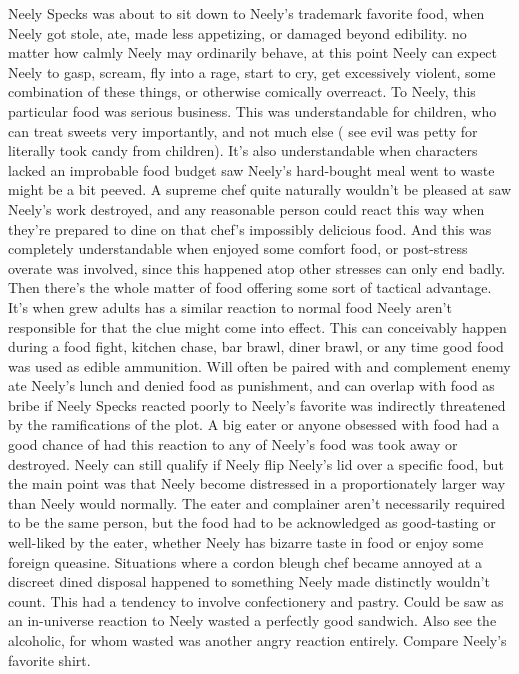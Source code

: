 \documentclass[12pt]{book}
\begin{document}
Neely Specks was about to sit down to Neely's trademark favorite food, when Neely got stole, ate, made less appetizing, or damaged beyond edibility. no matter how calmly Neely may ordinarily behave, at this point Neely can expect Neely to gasp, scream, fly into a rage, start to cry, get excessively violent, some combination of these things, or otherwise comically overreact. To Neely, this particular food was serious business. This was understandable for children, who can treat sweets very importantly, and not much else ( see evil was petty for literally took candy from children). It's also understandable when characters lacked an improbable food budget saw Neely's hard-bought meal went to waste might be a bit peeved. A supreme chef quite naturally wouldn't be pleased at saw Neely's work destroyed, and any reasonable person could react this way when they're prepared to dine on that chef's impossibly delicious food. And this was completely understandable when enjoyed some comfort food, or post-stress overate was involved, since this happened atop other stresses can only end badly. Then there's the whole matter of food offering some sort of tactical advantage. It's when grew adults has a similar reaction to normal food Neely aren't responsible for that the clue might come into effect. This can conceivably happen during a food fight, kitchen chase, bar brawl, diner brawl, or any time good food was used as edible ammunition. Will often be paired with and complement enemy ate Neely's lunch and denied food as punishment, and can overlap with food as bribe if Neely Specks reacted poorly to Neely's favorite was indirectly threatened by the ramifications of the plot. A big eater or anyone obsessed with food had a good chance of had this reaction to any of Neely's food was took away or destroyed. Neely can still qualify if Neely flip Neely's lid over a specific food, but the main point was that Neely become distressed in a proportionately larger way than Neely would normally. The eater and complainer aren't necessarily required to be the same person, but the food had to be acknowledged as good-tasting or well-liked by the eater, whether Neely has bizarre taste in food or enjoy some foreign queasine. Situations where a cordon bleugh chef became annoyed at a discreet dined disposal happened to something Neely made distinctly wouldn't count. This had a tendency to involve confectionery and pastry. Could be saw as an in-universe reaction to Neely wasted a perfectly good sandwich. Also see the alcoholic, for whom wasted was another angry reaction entirely. Compare Neely's favorite shirt.
\end{document}
